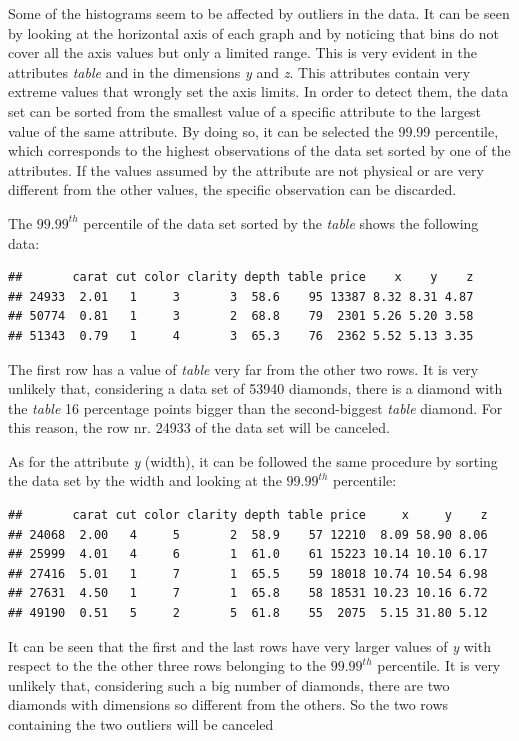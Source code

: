 \documentclass[
]{article}
\begin{document}
Some of the histograms seem to be affected by outliers in the data. It
can be seen by looking at the horizontal axis of each graph and by
noticing that bins do not cover all the axis values but only a limited
range. This is very evident in the attributes \emph{table} and in the
dimensions \emph{y} and \emph{z}. This attributes contain very extreme
values that wrongly set the axis limits. In order to detect them, the
data set can be sorted from the smallest value of a specific attribute
to the largest value of the same attribute. By doing so, it can be
selected the 99.99 percentile, which corresponds to the highest
observations of the data set sorted by one of the attributes. If the
values assumed by the attribute are not physical or are very different
from the other values, the specific observation can be discarded.

The \(99.99^{th}\) percentile of the data set sorted by the \emph{table}
shows the following data:

\begin{verbatim}
##       carat cut color clarity depth table price    x    y    z
## 24933  2.01   1     3       3  58.6    95 13387 8.32 8.31 4.87
## 50774  0.81   1     3       2  68.8    79  2301 5.26 5.20 3.58
## 51343  0.79   1     4       3  65.3    76  2362 5.52 5.13 3.35
\end{verbatim}

The first row has a value of \emph{table} very far from the other two
rows. It is very unlikely that, considering a data set of 53940
diamonds, there is a diamond with the \emph{table} 16 percentage points
bigger than the second-biggest \emph{table} diamond. For this reason,
the row nr. 24933 of the data set will be canceled.

As for the attribute \emph{y} (width), it can be followed the same
procedure by sorting the data set by the width and looking at the
\(99.99^{th}\) percentile:

\begin{verbatim}
##       carat cut color clarity depth table price     x     y    z
## 24068  2.00   4     5       2  58.9    57 12210  8.09 58.90 8.06
## 25999  4.01   4     6       1  61.0    61 15223 10.14 10.10 6.17
## 27416  5.01   1     7       1  65.5    59 18018 10.74 10.54 6.98
## 27631  4.50   1     7       1  65.8    58 18531 10.23 10.16 6.72
## 49190  0.51   5     2       5  61.8    55  2075  5.15 31.80 5.12
\end{verbatim}

It can be seen that the first and the last rows have very larger values
of \emph{y} with respect to the the other three rows belonging to the
\(99.99^{th}\) percentile. It is very unlikely that, considering such a
big number of diamonds, there are two diamonds with dimensions so
different from the others. So the two rows containing the two outliers
will be canceled
\end{document}
